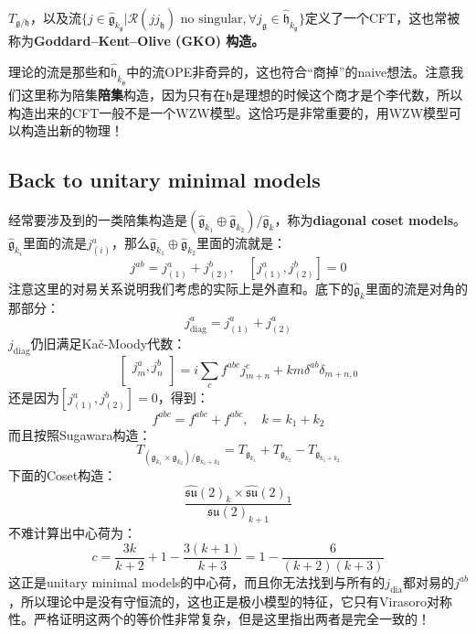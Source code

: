 \begin{definition}
	$T_{\mathfrak{g}/\mathfrak{h}}$，以及流$\{j\in\hat{\mathfrak{g}}_{k_\mathfrak{g}}|\mathcal{R}(jj_{\mathfrak{h}}) \text { no singular},\forall j_{\mathfrak{g}}\in \hat{\mathfrak{h}}_{k_\mathfrak{g}}\}$定义了一个CFT，这也常被称为\textbf{Goddard–Kent–Olive
		(GKO) 构造。}
\end{definition}
\begin{remark}
	理论的流是那些和$\hat{\mathfrak{h}}_{k_\mathfrak{g}}$中的流OPE非奇异的，这也符合“商掉”的naive想法。注意我们这里称为陪集\textbf{陪集}构造，因为只有在$\mathfrak{h}$是理想的时候这个商才是个李代数，所以构造出来的CFT一般不是一个WZW模型。这恰巧是非常重要的，用WZW模型可以构造出新的物理！
\end{remark}
\subsection{Back to unitary minimal models}
经常要涉及到的一类陪集构造是$(\hat{\mathfrak{g}}_{k_1}\oplus\hat{\mathfrak{g}}_{k_2})/\hat{\mathfrak{g}}_k$，称为\textbf{diagonal coset models}。$\hat{\mathfrak{g}}_{k_i}$里面的流是$j^a_{(i)}$，那么$\hat{\mathfrak{g}}_{k_1}\oplus\hat{\mathfrak{g}}_{k_2}$里面的流就是：
\begin{equation}
	j^{ab}=j_{(1)}^a+j_{(2)}^b,\quad [j_{(1)}^a,j_{(2)}^b]=0
\end{equation}
注意这里的对易关系说明我们考虑的实际上是外直和。底下的$\hat{\mathfrak{g}}_k$里面的流是对角的那部分：
\begin{equation}
	j_{\mathrm{diag}}^a=j_{(1)}^a+j_{(2)}^a
\end{equation}
$j_{\mathrm{diag}}$仍旧满足Ka\v{c}-Moody代数：
\begin{equation}
	\left.\left[\begin{array}{c}j_m^a,j_n^b\\\end{array}\right.\right]=i\sum_cf^{abc}j_{m+n}^c+km\delta^{ab}\delta_{m+n,0}
\end{equation}
还是因为$[j_{(1)}^a,j_{(2)}^b]=0$，得到：
\begin{equation}
	f^{abc}=f^{abc}+f^{abc},\quad k=k_1+k_2
\end{equation}
而且按照Sugawara构造：
\begin{equation}
	T_{(\mathfrak{g}_{k_1}\times\mathfrak{g}_{k_2})/\mathfrak{g}_{k_1+k_2}}=T_{\mathfrak{g}_{k_1}}+T_{\mathfrak{g}_{k_2}}-T_{\mathfrak{g}_{k_1+k_2}}
\end{equation}
下面的Coset构造：
\begin{equation}\label{coset}
	\frac{\widehat{\mathfrak{su}}(2)_k\times\widehat{\mathfrak{su}}(2)_1}{\mathfrak{su}(2)_{k+1}}
\end{equation}
不难计算出中心荷为：
\begin{equation}
	c=\frac{3k}{k+2}+1-\frac{3\left(k+1\right)}{k+3}=1-\frac6{(k+2)(k+3)}
\end{equation}
这正是unitary minimal models的中心荷，而且你无法找到与所有的$j_{\mathrm{dia}}$都对易的$j^{ab}$，所以理论中是没有守恒流的，这也正是极小模型的特征，它只有Virasoro对称性。严格证明这两个的等价性非常复杂，但是这里指出两者是完全一致的！
